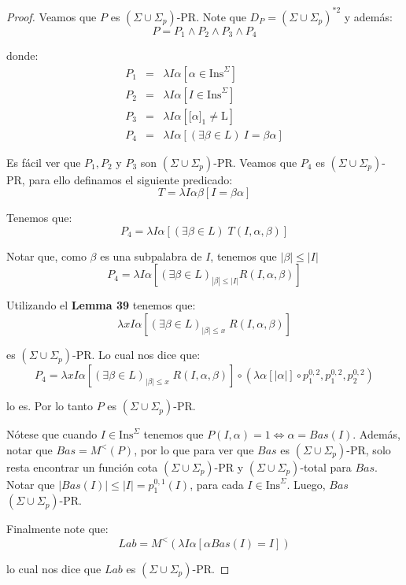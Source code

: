 \begin{proof}
    \PN Veamos que $P$ es $(\Sigma \cup \Sigma_{p})$-PR. Note que $D_{P} = (\Sigma \cup \Sigma_{p})^{\ast 2}$ y además:
    \[
      P = P_1 \wedge P_2 \wedge P_3 \wedge P_4
    \]

    \PN donde:
    \begin{eqnarray*}
      P_1 &=& \lambda I\alpha \left[\alpha \in \mathrm{Ins}^{\Sigma}\right] \\
      P_2 &=& \lambda I\alpha \left[I \in \mathrm{Ins}^{\Sigma}\right] \\
      P_3 &=& \lambda I\alpha \left[\lbrack \alpha]_{1} \neq \mathrm{L}\right] \\
      P_4 &=& \lambda I\alpha \left[ (\exists \beta \in L)\ I = \beta\alpha \right]
    \end{eqnarray*}

    \PN Es fácil ver que $P_1, P_2$ y $P_3$ son $(\Sigma \cup \Sigma_{p})$-PR. Veamos que $P_4$ es $(\Sigma \cup
    \Sigma_{p})$-PR, para ello definamos el siguiente predicado:
    \[
      T = \lambda I\alpha\beta \left[ I = \beta\alpha\right]
    \]

    \PN Tenemos que:
    \[
      P_4 = \lambda I\alpha \left[(\exists \beta \in L) \; T(I,\alpha,\beta)\right]
    \]

    \PN Notar que, como $\beta$ es una subpalabra de $I$, tenemos que $|\beta| \leq |I|$
    \[
      P_4 = \lambda I\alpha \left[ (\exists \beta \in L)_{|\beta|\leq |I|} R(I, \alpha, \beta) \right]
    \]

    \PN Utilizando el \textbf{Lemma 39} tenemos que:
    \[
      \lambda xI\alpha \left[(\exists \beta \in L)_{\lvert \beta \rvert \leq x} \; R(I,\alpha,\beta)\right]
    \]

    \PN es $(\Sigma \cup \Sigma_{p})$-PR. Lo cual nos dice que:
    \[
      P_4 = \lambda xI\alpha \left[(\exists \beta \in L)_{\lvert \beta \rvert \leq x} \; R(I,\alpha,\beta)\right] \circ
      (\lambda \alpha \left[\lvert \alpha \rvert\right] \circ p_{1}^{0,2},p_{1}^{0,2},p_{2}^{0,2})
    \]

    \PN lo es. Por lo tanto $P$ es $(\Sigma \cup \Sigma_{p})$-PR.

    \vspace{3mm}
    \PN Nótese que cuando $I \in \mathrm{Ins}^{\Sigma}$ tenemos que $P(I,\alpha)=1 \Leftrightarrow \alpha=Bas(I)$.
    Además, notar que $Bas = M^{<}\left(P\right)$, por lo que para ver que $Bas$ es $(\Sigma \cup \Sigma_{p})$-PR, solo
    resta encontrar un función cota $(\Sigma \cup \Sigma_{p})$-PR y $(\Sigma \cup \Sigma_{p})$-total para $Bas$. Notar
    que $\lvert Bas(I)\rvert \leq \lvert I \rvert = p_{1}^{0,1}(I)$, para cada $I \in \mathrm{Ins}^{\Sigma}$. Luego,
    $Bas$ $(\Sigma \cup \Sigma_{p})$-PR.

    \vspace{3mm}
    \PN Finalmente note que:
    \[
      Lab = M^{<} \left(\lambda I\alpha \left[\alpha Bas(I)=I\right]\right)
    \]

    \PN lo cual nos dice que $Lab$ es $(\Sigma \cup \Sigma_{p})$-PR.
  \end{proof}

